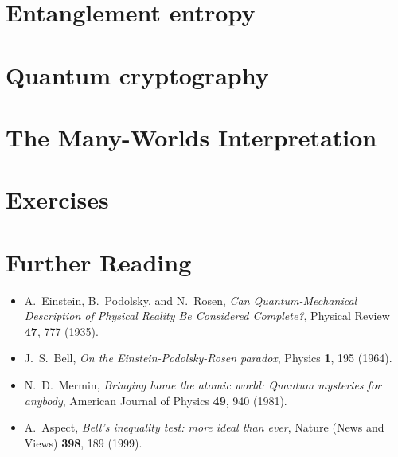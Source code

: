 \documentclass[pra,11pt]{revtex4}
\begin{document}
\section{Entanglement entropy}

\section{Quantum cryptography}

\section{The Many-Worlds Interpretation}

\section{Exercises}





\section{Further Reading}

\begin{itemize}
\item A.~Einstein, B.~Podolsky, and N.~Rosen,
  \textit{Can Quantum-Mechanical Description of Physical Reality Be
    Considered Complete?}, Physical Review \textbf{47}, 777 (1935).

\item J.~S.~Bell, \textit{On the Einstein-Podolsky-Rosen paradox},
  Physics \textbf{1}, 195 (1964).
  
\item N.~D.~Mermin, \textit{Bringing home the atomic world: Quantum
  mysteries for anybody}, American Journal of Physics \textbf{49}, 940
  (1981).

\item A.~Aspect, \textit{Bell's inequality test: more ideal than ever},
  Nature (News and Views) \textbf{398}, 189 (1999).
\end{itemize}
\end{document}
